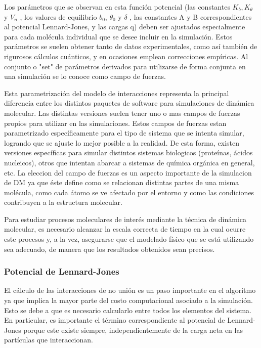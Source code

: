 Los parámetros que se observan en esta función potencial (las constantes $K_b, K_{\theta}$ y $V_n$ , los valores de equilibrio $b_0$, $\theta_0$ y $\delta$ , 
las constantes A y B correspondientes al potencial Lennard-Jones, y las cargas q) deben ser ajustados especialmente para cada molécula individual que se desee incluir en la 
simulación. Estos parámetros se suelen obtener tanto de datos experimentales, como así también de rigurosos cálculos cuánticos, y en ocasiones emplean correcciones empíricas.
Al conjunto o "set" de parámetros derivados para utilizarse de forma conjunta en una simulación se lo conoce como campo de fuerzas.

Esta parametrización del modelo de interacciones representa la principal diferencia entre los distintos paquetes de software para simulaciones de dinámica molecular. 
Las distintas versiones suelen tener uno o mas campos de fuerzas propios para utilizar en las simulaciones. 
Estos campos de fuerzas estan parametrizado específicamente para el tipo de sistema que se intenta simular, logrando que se ajuste lo mejor posible a la realidad.
De esta forma, existen versiones específicas para simular distintos sistemas biologicos (proteínas, ácidos nucleicos), otros que intentan abarcar a sistemas de química orgánica en general, etc.
La eleccion del campo de fuerzas es un aspecto importante de la simulacion de DM ya que éste define como se relacionan distintas partes de una misma molécula, como cada átomo se ve afectado por el entorno y como las condiciones contribuyen a la estructura molecular. 

Para estudiar procesos moleculares de interés mediante la técnica de dinámica molecular, es necesario alcanzar la escala correcta de tiempo en la cual ocurre este procesos y, a la vez, asegurarse que el modelado físico
que se está utilizando sea adecuado, de manera que los resultados obtenidos sean precisos.\cite{piana2014assessing}



\subsubsection{Potencial de Lennard-Jones}

El cálculo de las interacciones de no unión es un paso importante en el algoritmo ya que implica la mayor parte del costo computacional asociado a la simulación. 
Esto se debe a que es necesario calcularlo entre todos los elementos del sistema. 
En particular, es importante el término correspondiente al potencial de Lennard-Jones porque este existe siempre, independientemente de la carga neta en las partículas que interaccionan.

